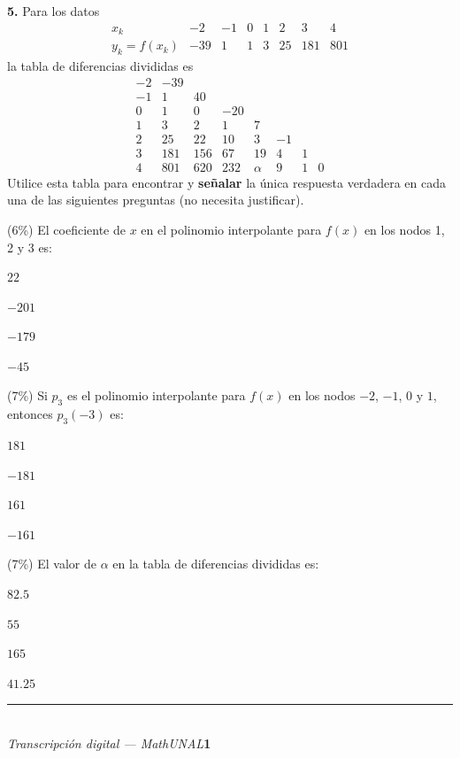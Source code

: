 \documentclass[11pt]{article}
\begin{document}
\vspace{5mm}
\noindent\textbf{5.} Para los datos
\[
\begin{array}{c|c|c|c|c|c|c|c}
x_k & -2 & -1 & 0 & 1 & 2 & 3 & 4\\ \hline
y_k=f(x_k) & -39 & 1 & 1 & 3 & 25 & 181 & 801
\end{array}
\]
la tabla de diferencias divididas es
\[
\begin{array}{cccccccc}
-2 & -39 & & & & & & \\
-1 & 1 & 40 & & & & & \\
0 & 1 & 0 & -20 & & & & \\
1 & 3 & 2 & 1 & 7 & & & \\
2 & 25 & 22 & 10 & 3 & -1 & & \\
3 & 181 & 156 & 67 & 19 & 4 & 1 & \\
4 & 801 & 620 & 232 & \alpha & 9 & 1 & 0
\end{array}
\]
Utilice esta tabla para encontrar y \textbf{señalar} la única respuesta verdadera en cada una de las siguientes preguntas (no necesita justificar).
\begin{romanitos}
\item (6\%) El coeficiente de $x$ en el polinomio interpolante para $f(x)$ en los nodos 1, 2 y 3 es:
\begin{opciones}
\item $22$
\item $-201$
\item $-179$
\item $-45$
\end{opciones}
\item (7\%) Si $p_3$ es el polinomio interpolante para $f(x)$ en los nodos $-2$, $-1$, $0$ y $1$, entonces $p_3(-3)$ es:
\begin{opciones}
\item $181$
\item $-181$
\item $161$
\item $-161$
\end{opciones}
\item (7\%) El valor de $\alpha$ en la tabla de diferencias divididas es:
\begin{opciones}
\item $82.5$
\item $55$
\item $165$
\item $41.25$
\end{opciones}
\end{romanitos}

\vfill
\rule{\linewidth}{0.4pt}\\[1pt]
{\scriptsize\textit{Transcripción digital --- MathUNAL}\hfill\textcolor{unalblue}{\textbf{1}}}
\end{document}
